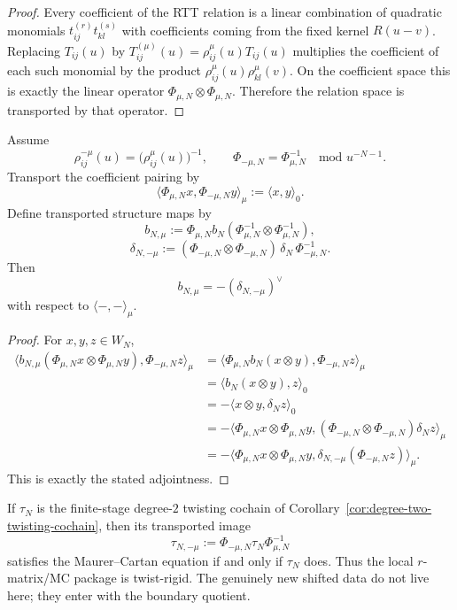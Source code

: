 \begin{proof}
Every coefficient of the RTT relation is a linear combination of quadratic
monomials $t_{ij}^{(r)}t_{kl}^{(s)}$ with coefficients coming from the fixed
kernel $R(u-v)$. Replacing $T_{ij}(u)$ by
$T_{ij}^{(\mu)}(u)=\rho_{ij}^\mu(u)T_{ij}(u)$ multiplies the coefficient of each
such monomial by the product $\rho_{ij}^\mu(u)\rho_{kl}^\mu(v)$. On the
coefficient space this is exactly the linear operator
$\Phi_{\mu,N}\otimes \Phi_{\mu,N}$. Therefore the relation space is transported
by that operator.
\end{proof}

\begin{theorem}
\label{thm:finite-stage-shifted-bar-adjointness}
Assume
\[
\rho_{ij}^{-\mu}(u)=\bigl(\rho_{ij}^{\mu}(u)\bigr)^{-1},
\qquad
\Phi_{-\mu,N}=\Phi_{\mu,N}^{-1}
\quad \text{mod }u^{-N-1}.
\]
Transport the coefficient pairing by
\[
\langle \Phi_{\mu,N}x,\Phi_{-\mu,N}y\rangle_\mu:=\langle x,y\rangle_0.
\]
Define transported structure maps by
\[
b_{N,\mu}
:=
\Phi_{\mu,N}b_N(\Phi_{\mu,N}^{-1}\otimes \Phi_{\mu,N}^{-1}),
\]
\[
\delta_{N,-\mu}
:=
(\Phi_{-\mu,N}\otimes \Phi_{-\mu,N})\,\delta_N\,\Phi_{-\mu,N}^{-1}.
\]
Then
\[
b_{N,\mu}=-(\delta_{N,-\mu})^\vee
\]
with respect to $\langle -, -\rangle_\mu$.
\end{theorem}

\begin{proof}
For $x,y,z\in W_N$,
\begin{align*}
\langle b_{N,\mu}(\Phi_{\mu,N}x\otimes \Phi_{\mu,N}y),\Phi_{-\mu,N}z\rangle_\mu
&=
\langle \Phi_{\mu,N}b_N(x\otimes y),\Phi_{-\mu,N}z\rangle_\mu \\
&=
\langle b_N(x\otimes y),z\rangle_0 \\
&=
-\langle x\otimes y,\delta_Nz\rangle_0 \\
&=
-\langle \Phi_{\mu,N}x\otimes \Phi_{\mu,N}y,
(\Phi_{-\mu,N}\otimes \Phi_{-\mu,N})\delta_Nz\rangle_\mu \\
&=
-\langle \Phi_{\mu,N}x\otimes \Phi_{\mu,N}y,
\delta_{N,-\mu}(\Phi_{-\mu,N}z)\rangle_\mu.
\end{align*}
This is exactly the stated adjointness.
\end{proof}

\begin{remark}
\label{rem:twist-rigidity-local-mc}
If $\tau_N$ is the finite-stage degree-$2$ twisting cochain of
Corollary~\ref{cor:degree-two-twisting-cochain}, then its transported image
\[
\tau_{N,-\mu}:=\Phi_{-\mu,N}\tau_N\Phi_{\mu,N}^{-1}
\]
satisfies the Maurer--Cartan equation if and only if $\tau_N$ does. Thus the
local $r$-matrix/MC package is twist-rigid. The genuinely new shifted data do
not live here; they enter with the boundary quotient.
\end{remark}


